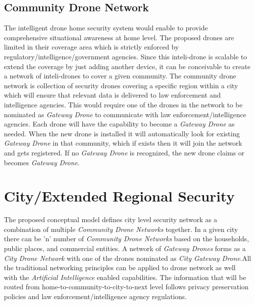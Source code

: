 \documentclass[sigconf]{acmart}
\begin{document}
\subsection{Community Drone Network}
The intelligent drone home security system would enable to provide comprehensive situational awareness at home level. The proposed drones are limited in their coverage area which is strictly enforced by regulatory/intelligence/government agencies. Since this inteli-drone is scalable to extend the coverage by just adding another device, it can be conceivable to create a network of inteli-drones to cover a given community. The community drone network is collection of security drones covering a specific region within a city which will ensure that relevant data is delivered to law enforcement and intelligence agencies. This would require one of the drones in the network to be nominated as \textit{Gateway Drone} to communicate with law enforcement/intelligence agencies. Each drone will have the capability to become a \textit{Gateway Drone} as needed. When the new drone is installed it will automatically look for existing \textit{Gateway Drone} in that community, which if exists then it will join the network and gets registered. If no \textit{Gateway Drone} is recognized, the new drone claims or becomes \textit{Gateway Drone}.

\section{City/Extended Regional Security}
The proposed conceptual model defines city level security network as a combination of multiple \textit{Community Drone Networks} together. In a given city there can be 'n' number of \textit{Community Drone Networks} based on the households, public places, and commercial entities. A network of \textit{Gateway Drones} forms as a \textit{City Drone Network} with one of the drones nominated as \textit{City Gateway Drone}.All the traditional networking principles can be applied to drone network as well with the \textit{Artificial Intelligence} enabled capabilities.
The information that will be routed from home-to-community-to-city-to-next level follows privacy preservation policies and law enforcement/intelligence agency regulations.
\end{document}
